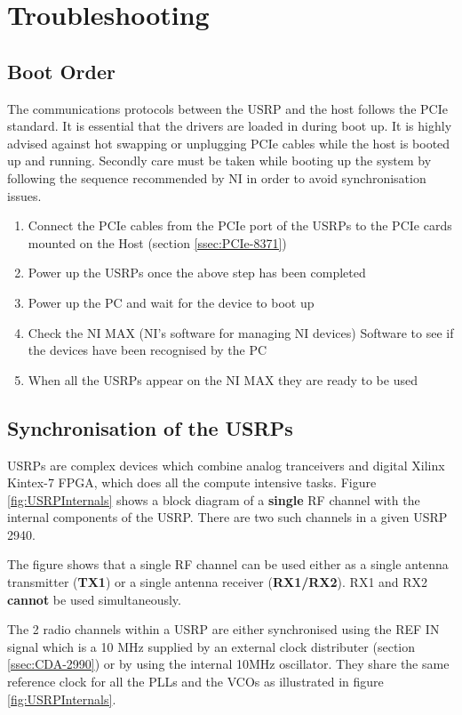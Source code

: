 \chapter{Troubleshooting}\label{ch:troubleshooting}
\section{Boot Order} \label{sec:BootOrder}
The communications protocols between the USRP and the host follows the PCIe standard. It is essential that the drivers are loaded in during boot up. It is highly advised against hot swapping or unplugging PCIe cables while the host is booted up and running. Secondly care must be taken while booting up the system by following the sequence recommended by NI in order to avoid synchronisation issues.

\begin{enumerate}
    \item Connect the PCIe cables from the PCIe port of the USRPs to the PCIe cards mounted on the Host (section \ref{ssec:PCIe-8371})
    \item Power up the USRPs once the above step has been completed
    \item Power up the PC and wait for the device to boot up
    \item Check the NI MAX (NI's software for managing NI devices) Software to see if the devices have been recognised by the PC
    \item When all the USRPs appear on the NI MAX they are ready to be used
\end{enumerate}

\section{Synchronisation of the USRPs} \label{sec:USRPSync}

USRPs are complex devices which combine analog tranceivers and digital Xilinx Kintex-7 FPGA, which does all the compute intensive tasks. Figure \ref{fig:USRPInternals} shows a block diagram of a \textbf{single} RF channel with the internal components of the USRP. There are two such channels in a given USRP 2940.

The figure shows that a single RF channel can be used either as a single antenna transmitter (\textbf{TX1}) or a single antenna receiver (\textbf{RX1/RX2}). RX1 and RX2 \textbf{cannot} be used simultaneously.

The 2 radio channels within a USRP are either synchronised using the REF IN signal which is a 10 MHz supplied by an external clock distributer (section \ref{ssec:CDA-2990}) or by using the internal 10MHz oscillator. They share the same reference clock for all the PLLs and the VCOs as illustrated in figure \ref{fig:USRPInternals}.

